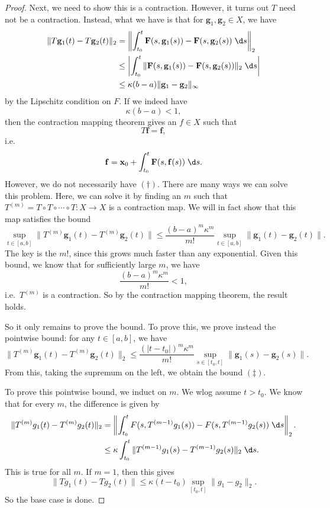 \documentclass[a4paper]{article}
\begin{document}
\begin{proof}
  Next, we need to show this is a contraction. However, it turns out $T$ need not be a contraction. Instead, what we have is that for $\mathbf{g}_1, \mathbf{g}_2 \in X$, we have
  \begin{align*}
    \|T \mathbf{g}_1(t) - T\mathbf{g}_2(t)\|_2 &= \left\|\int_{t_0}^t \mathbf{F}(s, \mathbf{g}_1(s)) - \mathbf{F}(s, \mathbf{g}_2(s))\;\d s\right\|_2\\
    &\leq \left|\int_{t_0}^t \|\mathbf{F}(s, \mathbf{g}_1(s)) - \mathbf{F}(s, \mathbf{g}_2(s))\|_2 \;\d s \right|\\
    &\leq \kappa (b - a) \|\mathbf{g}_1 - \mathbf{g}_2\|_\infty
  \end{align*}
  by the Lipschitz condition on $F$. If we indeed have
  \[
    \kappa (b - a) < 1 \tag{$\dagger$},
  \]
  then the contraction mapping theorem gives an $f \in X$ such that
  \[
    T\mathbf{f} = \mathbf{f},
  \]
  i.e.
  \[
    \mathbf{f} = \mathbf{x}_0 + \int_{t_0}^t \mathbf{F}(s, \mathbf{f}(s))\;\d s.
  \]
  However, we do not necessarily have $(\dagger)$. There are many ways we can solve this problem. Here, we can solve it by finding an $m$ such that $T^{(m)} = T\circ T \circ \cdots \circ T: X \to X$ is a contraction map. We will in fact show that this map satisfies the bound
  \[
    \sup_{t \in [a, b]} \|T^{(m)}\mathbf{g}_1(t) - T^{(m)}\mathbf{g}_2(t)\| \leq \frac{(b - a)^m \kappa^m}{m!} \sup_{t \in [a, b]} \|\mathbf{g}_1(t) - \mathbf{g}_2(t)\|. \tag{$\ddag$}
  \]
  The key is the $m!$, since this grows much faster than any exponential. Given this bound, we know that for sufficiently large $m$, we have
  \[
    \frac{(b - a)^m \kappa^m}{m!} < 1,
  \]
  i.e.\ $T^{(m)}$ is a contraction. So by the contraction mapping theorem, the result holds.

  So it only remains to prove the bound. To prove this, we prove instead the pointwise bound: for any $t \in [a, b]$, we have
  \[
    \|T^{(m)}\mathbf{g}_1(t) - T^{(m)}\mathbf{g}_2(t)\|_2 \leq \frac{(|t - t_0|)^m \kappa^m}{m!} \sup_{s \in [t_0, t]}\|\mathbf{g}_1(s) - \mathbf{g}_2(s)\|.
  \]
  From this, taking the supremum on the left, we obtain the bound $(\ddag)$.

  To prove this pointwise bound, we induct on $m$. We wlog assume $t > t_0$. We know that for every $m$, the difference is given by
  \begin{align*}
    \|T^{(m)}g_1(t) - T^{(m)}g_2(t)\|_2 &= \left\|\int_{t_0}^t F(s, T^{(m - 1)}g_1(s)) - F(s, T^{(m - 1)} g_2(s))\;\d s\right\|_2.\\
    &\leq \kappa\int_{t_0}^t \|T^{(m - 1)} g_1(s) - T^{(m - 1)} g_2(s)\|_2 \;\d s.
  \end{align*}
  This is true for all $m$. If $m = 1$, then this gives
  \[
    \|T g_1(t) - T g_2(t)\| \leq \kappa(t - t_0) \sup_{[t_0, t]} \|g_1 - g_2\|_2.
  \]
  So the base case is done.


\end{proof}
\end{document}
